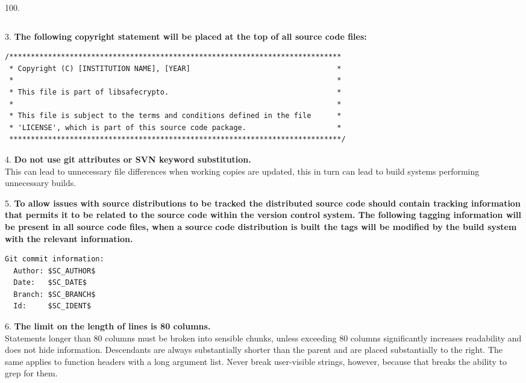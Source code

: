 \begin{labeling}{100.}
\begin{verbatim}
\end{verbatim}
\item [3.] \textbf{The following copyright statement will be placed at the top of all source code files:}
\begin{verbatim}
/*****************************************************************************
 * Copyright (C) [INSTITUTION NAME], [YEAR]                                  *
 *                                                                           *
 * This file is part of libsafecrypto.                                       *
 *                                                                           *
 * This file is subject to the terms and conditions defined in the file      *
 * 'LICENSE', which is part of this source code package.                     *
 *****************************************************************************/
 \end{verbatim}
\item [4.] \textbf{Do not use git attributes or SVN keyword substitution.} \\
   This can lead to unnecessary file differences when working copies are updated, this in turn can lead to build systems performing unnecessary builds. \\
\item [5.] \textbf{To allow issues with source distributions to be tracked the distributed source code should contain tracking information that permits it to be related to the source code within the version control system. The following tagging information will be present in all source code files, when a source code distribution is built the tags will be modified by the build system with the relevant information.}
\begin{verbatim}
Git commit information:
  Author: $SC_AUTHOR$
  Date:   $SC_DATE$
  Branch: $SC_BRANCH$
  Id:     $SC_IDENT$
\end{verbatim}
\item [6.] \textbf{The limit on the length of lines is 80 columns.} \\
   Statements longer than 80 columns must be broken into sensible chunks, unless exceeding 80 columns significantly increases readability and does not hide information. Descendants are always substantially shorter than the parent and  are placed substantially to the right. The same applies to function headers with a long argument list. Never break user-visible strings, however, because that breaks the ability to grep for them. \\

\end{labeling}
